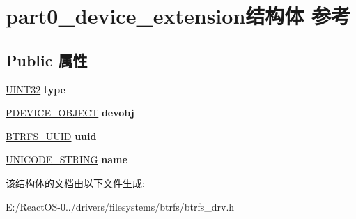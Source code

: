 \hypertarget{structpart0__device__extension}{}\section{part0\+\_\+device\+\_\+extension结构体 参考}
\label{structpart0__device__extension}
\subsection*{Public 属性}
\begin{DoxyCompactItemize}
\item 
\mbox{\label{structpart0__device__extension_ac55fcdced9a4f7534e3bbe4e46068d65}} 
\hyperlink{_processor_bind_8h_ae1e6edbbc26d6fbc71a90190d0266018}{U\+I\+N\+T32} {\bfseries type}
\item 
\mbox{\label{structpart0__device__extension_a6e234f22fc26f3e267e72bc62432c171}} 
\hyperlink{struct___d_e_v_i_c_e___o_b_j_e_c_t}{P\+D\+E\+V\+I\+C\+E\+\_\+\+O\+B\+J\+E\+CT} {\bfseries devobj}
\item 
\mbox{\label{structpart0__device__extension_a1d0f73bd54589d47f78500ba93f17d93}} 
\hyperlink{struct_b_t_r_f_s___u_u_i_d}{B\+T\+R\+F\+S\+\_\+\+U\+U\+ID} {\bfseries uuid}
\item 
\mbox{\label{structpart0__device__extension_a2b0d8773f9b57e858ab046fbdcb02e48}} 
\hyperlink{struct___u_n_i_c_o_d_e___s_t_r_i_n_g}{U\+N\+I\+C\+O\+D\+E\+\_\+\+S\+T\+R\+I\+NG} {\bfseries name}
\end{DoxyCompactItemize}


该结构体的文档由以下文件生成\+:\begin{DoxyCompactItemize}
\item 
E\+:/\+React\+O\+S-\/0../drivers/filesystems/btrfs/btrfs\+\_\+drv.\+h\end{DoxyCompactItemize}
